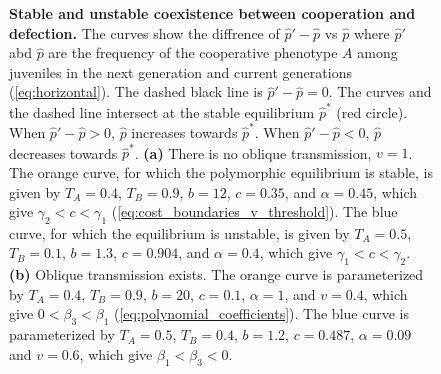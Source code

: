 \documentclass[12pt]{extarticle}
\begin{document}
\begin{figure}[p]
  \caption{\textbf{Stable and unstable coexistence between cooperation and defection.}
  The curves show the diffrence of $\hat{p}'-\hat{p}$ vs $\hat{p}$ where $\hat{p}'$ abd $\hat{p}$ are the frequency of the cooperative phenotype $A$ among juveniles in the next generation and current generations (\autoref{eq:horizontal}).
  The dashed black line is $\hat{p}'-\hat{p}=0$.
  The curves and the dashed line intersect at the stable equilibrium $\hat{p}^*$ (red circle).
  When $\hat{p}' - \hat{p} > 0 $,  $\hat{p}$ increases towards $\hat{p}^*$.
  When $\hat{p}' - \hat{p} < 0$, $\hat{p}$ decreases towards $\hat{p}^*$.
  \textbf{(a)} There is no oblique transmission, $v=1$.
  The orange curve, for which the polymorphic equilibrium is stable, is given by $T_A = 0.4$, $T_B = 0.9$, $b = 12$, $c=0.35$, and $\alpha = 0.45$, which give $\gamma_2<c<\gamma_1$ (\autoref{eq:cost_boundaries_v_threshold}).
  The blue curve, for which the equilibrium is unstable, is given by $T_A = 0.5$, $T_B = 0.1$, $b = 1.3$, $c=0.904$, and $\alpha = 0.4$, which give $\gamma_1<c<\gamma_2$.
  \textbf{(b)} Oblique transmission exists. 
  The orange curve is parameterized by $T_A = 0.4$, $T_B = 0.9$, $b = 20$, $c=0.1$, $\alpha = 1$, and $v=0.4$, which give $0<\beta_3<\beta_1$ (\autoref{eq:polynomial_coefficients}).
  The blue curve is parameterized by $T_A = 0.5$, $T_B = 0.4$, $b=1.2$, $c=0.487$, $\alpha = 0.09$ and $v=0.6$, which give $\beta_1<\beta_3<0$.
  }
  \label{fig:coexistence_recursive}
  \end{figure}
\end{document}
